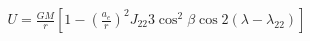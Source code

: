 \documentclass[10pt]{article}
\begin{document}
\begin{align*}U = \frac{G M}{r} \left[ 1 - \left( \frac{a_{e}}{r} \right)^2 J_{22} 3 \cos^2 \beta \cos 2 \left( \lambda - \lambda_{22} \right) \right]\end{align*}
\end{document}
